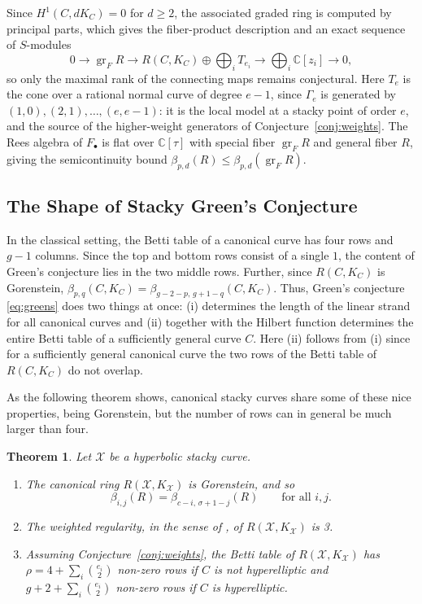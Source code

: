 \documentclass[11pt,reqno]{amsart}
\newtheorem{theorem}[lemma]{Theorem}
\theoremstyle{remark}
\newcommand{\CC}{\mathbb{C}}
\newcommand{\cX}{\mathcal{X}}
\begin{document}
Since $H^1(C,dK_C)=0$ for $d\geq2$, the associated graded ring is computed by principal parts, which gives the fiber-product description and an exact sequence of $S$-modules
\begin{equation}\label{eq:fiber}
	0\longrightarrow \operatorname{gr}_FR\longrightarrow R(C,K_C)\oplus\bigoplus_iT_{e_i}\longrightarrow\bigoplus_i\CC[z_i]\longrightarrow 0,
\end{equation}
so only the maximal rank of the connecting maps remains conjectural. Here $T_e$ is the cone over a rational normal curve of degree $e-1$, since $\Gamma_e$ is generated by $(1,0),(2,1),\ldots,(e,e-1)$: it is the local model at a stacky point of order $e$, and the source of the higher-weight generators of Conjecture~\ref{conj:weights}. The Rees algebra of $F_{\bullet}$ is flat over $\CC[\tau]$ with special fiber $\operatorname{gr}_FR$ and general fiber $R$, giving the semicontinuity bound $\beta_{p,d}(R)\leq\beta_{p,d}(\operatorname{gr}_FR)$.

\subsection{The Shape of Stacky Green's Conjecture}\label{subsec:weighted-canonical}

In the classical setting, the Betti table of a canonical curve has four rows and $g-1$ columns. Since the top and bottom rows consist of a single  $1$, the content of Green's conjecture lies in the two middle rows. Further, since $R(C,K_C)$ is Gorenstein, $\beta_{p,q}(C,K_{C})=\beta_{g-2-p,\,g+1-q}(C,K_C)$. Thus, Green's conjecture \eqref{eq:greens} does two things at once: (i) determines the length of the linear strand for all canonical curves and (ii) together with the Hilbert function determines the entire Betti table of a sufficiently general curve $C$. Here (ii) follows from (i) since for a sufficiently general canonical curve the two rows of the Betti table of $R(C,K_C)$ do not overlap. 

As the following theorem shows, canonical stacky curves share some of these nice properties, being Gorenstein, but the number of rows can in general be much larger than four.

\begin{theorem}\label{thm:duality}
Let $\cX$ be a hyperbolic stacky curve.
\begin{enumerate}
\item  The canonical ring $R(\cX,K_{\cX})$ is Gorenstein, and so 
\[
	\beta_{i,j}(R)=\beta_{c-i,\,\sigma+1-j}(R)\qquad\text{for all $i,j$}.
\]
\item The weighted regularity, in the sense of \cite{brownErman25}, of $R(\cX,K_{\cX})$ is 3.
\item Assuming Conjecture~\ref{conj:weights}, the Betti table of $R(\cX,K_{\cX})$ has $\rho=4+\sum_i\binom{e_i}{2}$ non-zero rows if $C$ is not hyperelliptic and $g+2+\sum_i\binom{e_i}{2}$ non-zero rows if $C$ is hyperelliptic.
\end{enumerate}
\end{theorem}
\end{document}
